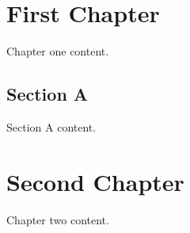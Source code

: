 \documentclass{book}
\begin{document}
\chapter{First Chapter}
Chapter one content.

\section{Section A}
Section A content.

\chapter{Second Chapter}
Chapter two content.
\end{document}

